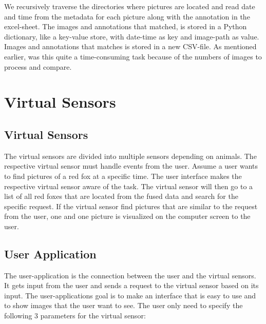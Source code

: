 \documentclass[USenglish]{uit-thesis}
\begin{document}
We recursively traverse the directories where pictures are located and read date and time from the metadata for each picture along with the annotation in the excel-sheet. The images and annotations that matched, is stored in a Python dictionary, like a key-value store, with date-time as key and image-path as value. Images and annotations that matches is stored in a new CSV-file.
As mentioned earlier, was this quite a time-consuming task because of the numbers of images to process and compare.


\section{Virtual Sensors}



\subsection{Virtual Sensors} \label{ssec:des_vs}
The virtual sensors are divided into multiple sensors depending on animals. The respective virtual sensor must handle events from the user. Assume a user wants to find pictures of a red fox at a specific time.  The user interface makes the respective virtual sensor aware of the task. The virtual sensor will then go to a list of all red foxes that are located from the fused data and search for the specific request. If the virtual sensor find pictures that are similar to the request from the user, one and one picture is visualized on the computer screen to the user.

\newpage

\subsection{User Application} \label{ssec:des_user}
The user-application is the connection between the user and the virtual sensors. It gets input from the user and sends a request to the virtual sensor based on its input. The user-applications goal is to make an interface that is easy to use and to show images that the user want to see.
The user only need to specify the following 3 parameters for the virtual sensor:
\end{document}

